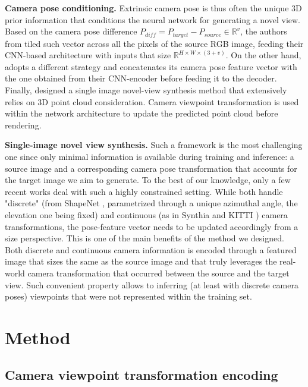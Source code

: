 \noindent\textbf{Camera pose conditioning.} Extrinsic camera pose is thus often the unique 3D prior information that conditions the neural network for generating a novel view. Based on the camera pose difference $P_{diff}=P_{target}-P_{source}\in \mathbb{R}^{v}$, the authors from \citep{sun2018multiview} tiled such vector across all the pixels of the source RGB image, feeding their CNN-based architecture with inputs that size $\mathbb{R}^{H\times W\times (3+v)}$. On the other hand, \citep{kim2020novel} adopts a different strategy and concatenates its camera pose feature vector with the one obtained from their CNN-encoder before feeding it to the decoder. 
Finally, \citep{wiles2020synsin} designed a single image novel-view synthesis method that extensively relies on 3D point cloud consideration. Camera viewpoint transformation is used within the network architecture to update the predicted point cloud before rendering. \newline

\noindent\textbf{Single-image novel view synthesis.} Such a framework is the most challenging one since only minimal information is available during training and inference: a source image and a corresponding camera pose transformation that accounts for the target image we aim to generate. To the best of our knowledge, only a few recent works \citep{sun2018multiview,kim2020novel,yu2021pixelnerf}  deal with such a highly constrained setting. While \citep{sun2018multiview, kim2020novel} both handle "discrete" (from ShapeNet \citep{chang2015shapenet}, parametrized through a unique azimuthal angle, the elevation one being fixed) and continuous (as in Synthia \citep{ros2016synthia} and KITTI \citep{geiger2012we}) camera transformations, the pose-feature vector needs to be updated accordingly from a size perspective. This is one of the main benefits of the method we designed. Both discrete and continuous camera information is encoded through a featured image that sizes the same as the source image and that truly leverages the real-world camera transformation that occurred between the source and the target view. Such convenient property allows to inferring (at least with discrete camera poses) viewpoints that were not represented within the training set. \newline

\section{Method}
\subsection{Camera viewpoint transformation encoding}
